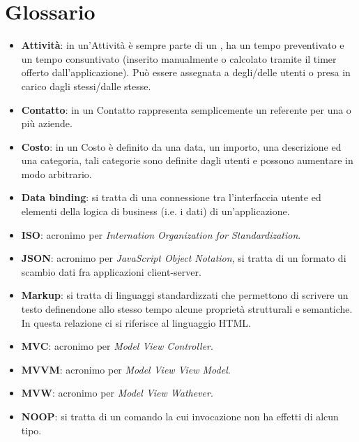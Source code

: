 \section{Glossario}

\begin{itemize}
\item \textbf{Attività}: in \fiscolo{} un'Attività è sempre parte di un ,
ha un tempo preventivato e un tempo consuntivato (inserito manualmente o calcolato tramite
il timer offerto dall'applicazione). Può essere assegnata a degli/delle utenti o presa
in carico dagli stessi/dalle stesse.

\item \textbf{Contatto}: in \fiscolo{} un Contatto rappresenta semplicemente un referente
per una o più aziende.

\item \textbf{Costo}: in \fiscolo{} un Costo è definito da una data, un importo, una
descrizione ed una categoria, tali categorie sono definite dagli utenti e possono aumentare
in modo arbitrario.

\item \textbf{Data binding}: si tratta di una connessione tra l'interfaccia utente ed
elementi della logica di business (i.e. i dati) di un'applicazione.

\item \textbf{ISO}: acronimo per \textit{Internation Organization for Standardization}.

\item \textbf{JSON}: acronimo per \textit{JavaScript Object Notation}, si tratta di un formato
di scambio dati fra applicazioni client-server.

\item \textbf{Markup}: si tratta di linguaggi standardizzati che permettono di scrivere un
testo definendone allo stesso tempo alcune proprietà strutturali e semantiche. In questa
relazione ci si riferisce al linguaggio HTML.

\item \textbf{MVC}: acronimo per \textit{Model View Controller}.

\item \textbf{MVVM}: acronimo per \textit{Model View View Model}.

\item \textbf{MVW}: acronimo per \textit{Model View Wathever}.

\item \textbf{NOOP}: si tratta di un comando la cui invocazione non ha effetti di alcun
tipo.


\end{itemize}
